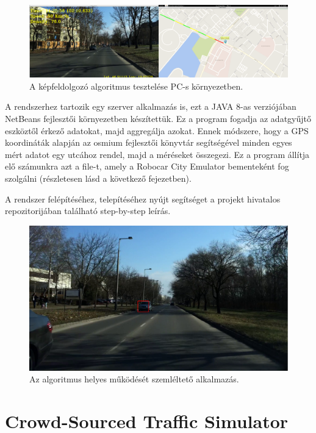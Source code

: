 \documentclass[a4paper,12pt]{report}
\begin{document}
\begin{figure}[h]
\centerline{
\includegraphics[width=6in]{img/rttapc}}
\caption{A képfeldolgozó algoritmus tesztelése PC-s környezetben.}
\label{rttapc}
\end{figure}

A rendszerhez tartozik egy szerver alkalmazás is, ezt a JAVA 8-as verziójában NetBeans fejlesztői környezetben készítettük. Ez a program fogadja az adatgyűjtő eszköztől érkező adatokat, majd aggregálja azokat. Ennek módszere, hogy a GPS koordináták alapján az osmium fejlesztői könyvtár segítségével minden egyes mért adatot egy utcához rendel, majd a méréseket összegezi. Ez a program állítja elő számunkra azt a file-t, amely a Robocar City Emulator bementeként fog szolgálni (részletesen lásd a következő fejezetben). 

A rendszer felépítéséhez, telepítéséhez nyújt segítséget a projekt hivatalos repozitorijában \cite{rtta} található step-by-step leírás.

\begin{figure}[h]
\centerline{
\includegraphics[width=6in]{img/carredrect}}
\caption{Az algoritmus helyes működését szemléltető alkalmazás.}
\label{carredrect}
\end{figure}

\chapter{Crowd-Sourced Traffic Simulator}
\label{cstschapter}
\end{document}
